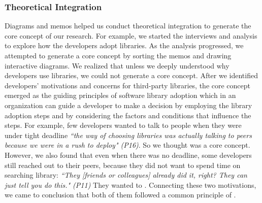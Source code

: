 \subsubsection{Theoretical Integration} 
Diagrams and memos helped us conduct theoretical integration to generate the core concept of our research. For example, we started the interviews and analysis to explore how the developers adopt libraries. As the analysis progressed, we attempted to generate a core concept by sorting the memos and drawing interactive diagrams. We realized that unless we deeply understood why developers use libraries, we could not generate a core concept. After we identified developers' motivations and concerns for third-party libraries, the core concept emerged as the guiding principles of software library adoption which in an organization can guide a developer to make a decision by employing the library adoption steps and by considering the factors and conditions that influence the steps. 
For example, few developers wanted to talk to people when they were under tight deadline \emph{``the way of choosing libraries was actually talking to peers because we were in a rush to deploy" (P16)}. So we thought  was a core concept. However, we also found that even when there was no deadline, some developers still reached out to their peers, because they did not want to spend time on searching library: \emph{``They [friends or colleagues] already did it, right? They can just tell you do this." (P11)} %
They wanted to . Connecting these two motivations, we came to conclusion that both of them followed a common principle of . 



